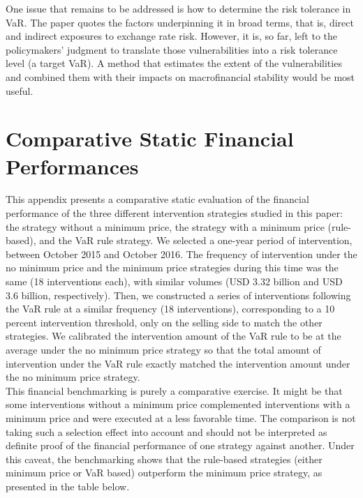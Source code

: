\documentclass[11pt]{article}
\begin{document}
One issue that remains to be addressed  is how to determine the risk tolerance
in VaR. The paper quotes the factors  underpinning it in broad terms, that is,
direct and indirect  exposures to exchange rate risk. However,  it is, so far,
left to the  policymakers' judgment to translate those  vulnerabilities into a
risk tolerance level (a target VaR). A method that estimates the extent of the
vulnerabilities  and  combined  them  with  their  impacts  on  macrofinancial
stability would be most useful.\\


\newpage
{}
\singlespacing



\newpage
\appendix 
\section{Comparative Static Financial Performances}
\label{sec:fin-perf}

This  appendix  presents a  comparative  static  evaluation of  the  financial
performance of  the three  different intervention  strategies studied  in this
paper: the strategy without a minimum price, the strategy with a minimum price
(rule-based), and  the VaR  rule strategy.  We selected  a one-year  period of
intervention,  between  October  2015  and  October  2016.  The  frequency  of
intervention  under the  no minimum  price  and the  minimum price  strategies
during this  time was the same  (18 interventions each), with  similar volumes
(USD 3.32 billion  and USD 3.6 billion, respectively). Then,  we constructed a
series of  interventions following  the VaR  rule at  a similar  frequency (18
interventions), corresponding to a 10  percent intervention threshold, only on
the selling side to match the other strategies. We calibrated the intervention
amount  of the  VaR rule  to be  at  the average  under the  no minimum  price
strategy so that  the total amount of intervention under  the VaR rule exactly
matched the intervention amount under the no minimum price strategy.\\

This financial benchmarking is purely a comparative exercise. It might be that
some interventions without  a minimum price complemented  interventions with a
minimum price  and were executed at  a less favorable time.  The comparison is
not taking such a selection effect  into account and should not be interpreted
as  definite  proof of  the  financial  performance  of one  strategy  against
another.  Under  this  caveat,  the benchmarking  shows  that  the  rule-based
strategies (either  minimum price or  VaR based) outperform the  minimum price
strategy, as presented in the table below.\\
\end{document}
